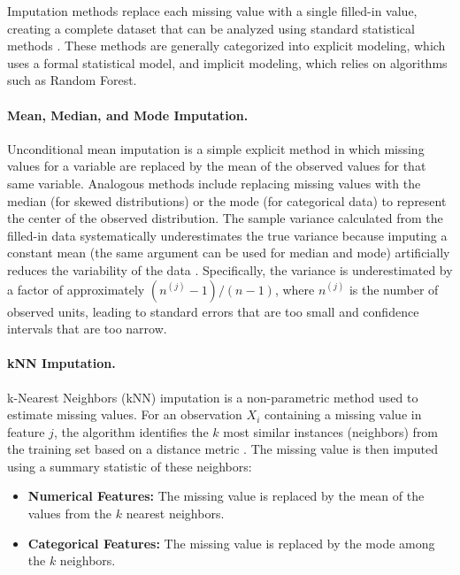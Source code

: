 \documentclass[11pt, a4paper]{article}
\begin{document}
Imputation methods replace each missing value with a single filled-in value, creating a complete dataset that can be analyzed using standard statistical methods \citep{LittleRubin2019}.
These methods are generally categorized into explicit modeling, which uses a formal statistical model, and implicit modeling, which relies on algorithms such as Random Forest.

\paragraph{Mean, Median, and Mode Imputation.}
Unconditional mean imputation is a simple explicit method in which missing values for a variable are replaced by the mean of the observed values for that same variable.
Analogous methods include replacing missing values with the median (for skewed distributions) or the mode (for categorical data) to represent the center of the observed distribution.
The sample variance calculated from the filled-in data systematically underestimates the true variance because imputing a constant mean (the same argument can be used for median and mode) artificially reduces the variability of the data \citep{LittleRubin2019}.
Specifically, the variance is underestimated by a factor of approximately $(n^{(j)}-1)/(n-1)$, where $n^{(j)}$ is the number of observed units, leading to standard errors that are too small and confidence intervals that are too narrow.

\paragraph{kNN Imputation.}
k-Nearest Neighbors (kNN) imputation is a non-parametric method used to estimate missing values.
For an observation $X_i$ containing a missing value in feature $j$, the algorithm identifies the $k$ most similar instances (neighbors) from the training set based on a distance metric \citep{Khan2026}.
The missing value is then imputed using a summary statistic of these neighbors:
\begin{itemize}
    \item \textbf{Numerical Features:} The missing value is replaced by the mean of the values from the $k$ nearest neighbors.
    \item \textbf{Categorical Features:} The missing value is replaced by the mode among the $k$ neighbors.
\end{itemize}
\end{document}
